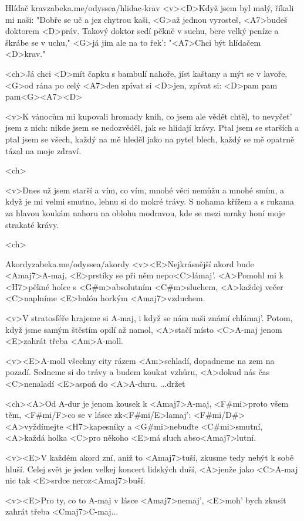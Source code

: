 \begin{song}{12}{Hlídač krav}{zabeka.me/odyssea/hlidac-krav}
	<v><D>Když jsem byl malý, říkali mi naši:
	"Dobře se uč a jez chytrou kaši,
	<G>až jednou vyrosteš, <A7>budeš doktorem <D>práv.
	Takový doktor sedí pěkně v suchu,
	bere velký peníze a škrábe se v uchu,"
	<G>já jim ale na to řek': "<A7>Chci být hlídačem <D>krav."

	<ch>Já chci <D>mít čapku s bambulí nahoře,
	jíst kaštany a mýt se v lavoře,
	<G>od rána po celý <A7>den zpívat si <D>jen,
	zpívat si: <D>pam pam pam<G><A7><D>

	<v>K vánocům mi kupovali hromady knih,
	co jsem ale vědět chtěl, to nevyčet' jsem z nich:
	nikde jsem se nedozvěděl, jak se hlídají krávy.
	Ptal jsem se starších a ptal jsem se všech,
	každý na mě hleděl jako na pytel blech,
	každý se mě opatrně tázal na moje zdraví.

	<ch>

	<v>Dnes už jsem starší a vím, co vím,
	mnohé věci nemůžu a mnohé smím,
	a když je mi velmi smutno, lehnu si do mokré trávy.
	S nohama křížem a s rukama za hlavou
	koukám nahoru na oblohu modravou,
	kde se mezi mraky honí moje strakaté krávy.

	<ch>
\end{song}
\begin{song}{13}{Akordy}{zabeka.me/odyssea/akordy}
	<v><E>Nejkrásnější akord bude <Amaj7>A-maj,
	<E>prstíky se při něm nepo<C>lámaj'.
	<A>Pomohl mi k <H7>pěkné holce s <G#m>absolutním <C#m>sluchem,
	<A>každej večer <C>naplníme <E>balón horkým <Amaj7>vzduchem.

	<v>V stratosféře hrajeme si A-maj,
	i když se nám naši známí chlámaj'.
	Potom, když jsme samým štěstím opilí až namol,
	<A>stačí místo <C>A-maj jenom <E>zahrát třeba <Am>A-moll.

	<v><E>A-moll všechny city rázem <Am>schladí,
	dopadneme na zem na pozadí.
	Sedneme si do trávy a budem koukat vzhůru,
	<A>dokud nás čas <C>nenaladí <E>aspoň do <A>A-duru. ...držet

	<ch><A>Od A-dur je jenom kousek k <Amaj7>A-maj,
	<F#mi>proto všem těm, <F#mi/F>co se v lásce zk<F#mi/E>lamaj': <F#mi/D#>
	<A>vyždímejte <H7>kapesníky a <G#mi>nebuďte <C#mi>smutní,
	<A>každá holka <C>pro někoho <E>má sluch abso<Amaj7>lutní.

	<v><E>V každém akord zní, aniž to <Amaj7>tuší,
	zkusme tedy nebýt k sobě hluší.
	Celej svět je jeden velkej koncert lidských duší,
	<A>jenže jako <C>A-maj nic tak <E>srdce neroz<Amaj7>buší.

	<v><E>Pro ty, co to A-maj v lásce <Amaj7>nemaj',
	<E>moh' bych zkusit zahrát třeba <Cmaj7>C-maj...
\end{song}
